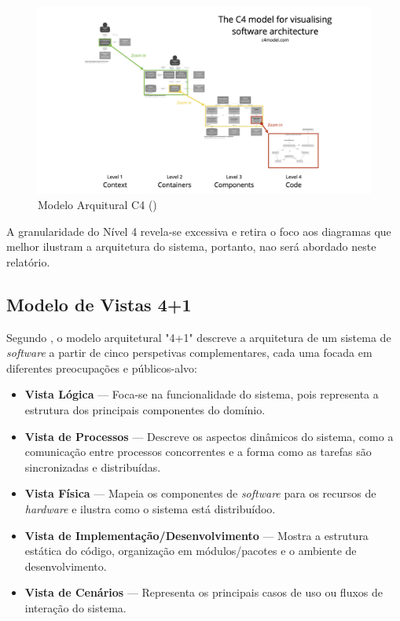 \begin{figure}[H]
    \centering
    \includegraphics[width=\linewidth,keepaspectratio]{frontmatter/assets/models/c4-overview.png}
    \caption{Modelo Arquitural C4 (\cite{C4Model})}
    \label{fig:c4model}
\end{figure}

A granularidade do Nível 4 revela-se excessiva e retira o foco aos diagramas que melhor ilustram a arquitetura do sistema, portanto, nao será abordado neste relatório.

\subsection{Modelo de Vistas 4+1}
\label{subsec:model4plus1}

Segundo \cite{Kruchten1995}, o modelo arquitetural "4+1" descreve a arquitetura de um sistema de \textit{software} a partir de cinco perspetivas complementares, cada uma focada em diferentes preocupações e públicos-alvo:

\begin{itemize}
\item \textbf{Vista Lógica} — Foca-se na funcionalidade do sistema, pois representa a estrutura dos principais componentes do domínio.

\item \textbf{Vista de Processos} — Descreve os aspectos dinâmicos do sistema, como a comunicação entre processos concorrentes e a forma como as tarefas são sincronizadas e distribuídas.

\item \textbf{Vista Física} — Mapeia os componentes de \textit{software} para os recursos de \textit{hardware} e ilustra como o sistema está distribuídoo.

\item \textbf{Vista de Implementação/Desenvolvimento} — Mostra a estrutura estática do código, organização em módulos/pacotes e o ambiente de desenvolvimento.

\item \textbf{Vista de Cenários} — Representa os principais casos de uso ou fluxos de interação do sistema.
\end{itemize}

